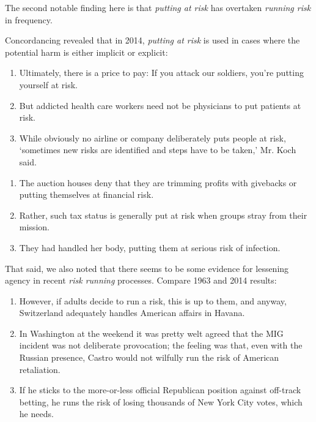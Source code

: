             The second notable finding here is that \emph{putting at risk} has overtaken \emph{running risk} in frequency.

             Concordancing revealed that in 2014, \emph{putting at risk} is used in cases where the potential harm is either implicit or explicit:

            \begin{enumerate}  [before=\itshape,font=\normalfont] \setlength\itemsep{0em} \small
                \item Ultimately, there is a price to pay: If you attack our soldiers, you're putting yourself at risk.
                \item But addicted health care workers need not be physicians to put patients at risk.
                \item While obviously no airline or company deliberately puts people at risk, `sometimes new risks are identified and steps have to be taken,' Mr. Koch said.
            \end{enumerate}

            \begin{enumerate}  [before=\itshape,font=\normalfont] \setlength\itemsep{0em} \small
                \item The auction houses deny that they are trimming profits with givebacks or putting themselves at financial risk.
                \item Rather, such tax status is generally put at risk when groups stray from their mission.
                \item They had handled her body, putting them at serious risk of infection.
            \end{enumerate}

            That said, we also noted that there seems to be some evidence for lessening agency in recent \emph{risk running} processes. Compare 1963 and 2014 results:

            \begin{enumerate} [before=\itshape,font=\normalfont]  \setlength\itemsep{0em} \small
            \item However, if adults decide to run a risk, this is up to them, and anyway, Switzerland adequately handles American affairs in Havana.
            \item In Washington at the weekend it was pretty welt agreed that the MIG incident was not deliberate provocation; the feeling was that, even with the Russian presence, Castro would not wilfully run the risk of American retaliation.
            \item  If he sticks to the more-or-less official Republican position against off-track betting, he runs the risk of losing thousands of New York City votes, which he needs.
            \end{enumerate}


